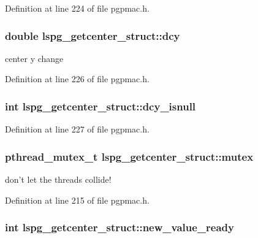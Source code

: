 Definition at line 224 of file pgpmac.\-h.

\hypertarget{structlspg__getcenter__struct_a55b1a488b714e6a40d8e06a6e182bd0a}{
\subsubsection[{dcy}]{\setlength{\rightskip}{0pt plus 5cm}double lspg\-\_\-getcenter\-\_\-struct\-::dcy}}\label{structlspg__getcenter__struct_a55b1a488b714e6a40d8e06a6e182bd0a}


center y change 



Definition at line 226 of file pgpmac.\-h.

\hypertarget{structlspg__getcenter__struct_a352c48c8d443c52f18ebd13019d01684}{
\subsubsection[{dcy\-\_\-isnull}]{\setlength{\rightskip}{0pt plus 5cm}int lspg\-\_\-getcenter\-\_\-struct\-::dcy\-\_\-isnull}}\label{structlspg__getcenter__struct_a352c48c8d443c52f18ebd13019d01684}


Definition at line 227 of file pgpmac.\-h.

\hypertarget{structlspg__getcenter__struct_a214bb7e88b137162f13f41f2c43002a9}{
\subsubsection[{mutex}]{\setlength{\rightskip}{0pt plus 5cm}pthread\-\_\-mutex\-\_\-t lspg\-\_\-getcenter\-\_\-struct\-::mutex}}\label{structlspg__getcenter__struct_a214bb7e88b137162f13f41f2c43002a9}


don't let the threads collide! 



Definition at line 215 of file pgpmac.\-h.

\hypertarget{structlspg__getcenter__struct_a4b350f11f1e375b9e9e839caaffbcb6b}{
\subsubsection[{new\-\_\-value\-\_\-ready}]{\setlength{\rightskip}{0pt plus 5cm}int lspg\-\_\-getcenter\-\_\-struct\-::new\-\_\-value\-\_\-ready}}\label{structlspg__getcenter__struct_a4b350f11f1e375b9e9e839caaffbcb6b}



